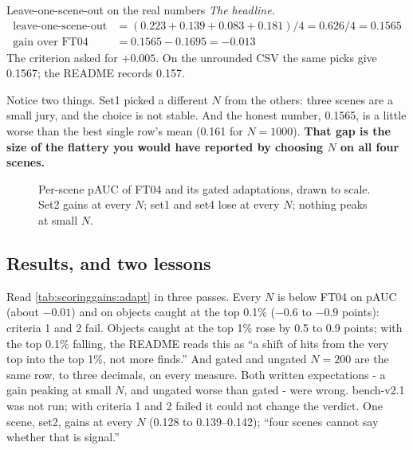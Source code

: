 \begin{worked}[label={we:scoringgains:loso}]{Leave-one-scene-out on the real numbers}
\emph{The headline.}
\begin{align*}
\text{leave-one-scene-out} &= (0.223 + 0.139 + 0.083 + 0.181)/4 = 0.626/4 = 0.1565\\
\text{gain over FT04} &= 0.1565 - 0.1695 = -0.013
\end{align*}
The criterion asked for $+0.005$. On the unrounded CSV the same picks give 0.1567\tagC; the README records 0.157.
\end{worked}

Notice two things. Set1 picked a different $N$ from the others: three scenes are a small jury, and the choice is not stable.
And the honest number, 0.1565, is a little worse than the best single row's mean (0.161 for $N = 1000$). \textbf{That gap is
the size of the flattery you would have reported by choosing $N$ on all four scenes.}

\begin{figure}[htbp]
\centering
{}
\caption{Per-scene pAUC of FT04 and its gated adaptations, drawn to scale. Set2 gains at every $N$; set1 and set4 lose at
every $N$; nothing peaks at small $N$.}
\label{fig:scoringgains:perscene}
\end{figure}

\subsection{Results, and two lessons}\label{sec:scoringgains:lessons}

Read \cref{tab:scoringgains:adapt} in three passes. Every $N$ is below FT04 on pAUC (about $-0.01$) and on objects caught at
the top 0.1\% ($-0.6$ to $-0.9$ points): criteria 1 and 2 fail. Objects caught at the top 1\% rose by 0.5 to 0.9 points;
with the top 0.1\% falling, the README reads this as ``a shift of hits from the very top into the top 1\%, not more finds.''
And gated and ungated $N = 200$ are the same row, to three decimals, on every measure. Both written expectations - a gain
peaking at small $N$, and ungated worse than gated - were wrong. bench-v2.1 was not run; with criteria 1 and 2 failed it could
not change the verdict. One scene, set2, gains at every $N$ (0.128 to 0.139--0.142); ``four scenes cannot say whether that is
signal.''

